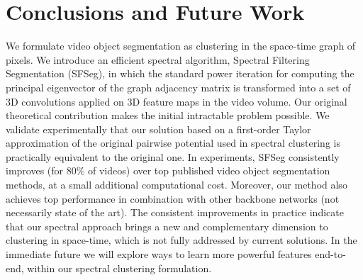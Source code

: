 \documentclass{article}
\begin{document}
\section{Conclusions and Future Work}
\label{sec: conclusions}
We formulate video object segmentation as clustering in the space-time graph of pixels.
We introduce an efficient spectral algorithm, Spectral Filtering Segmentation (SFSeg), in which the standard power iteration for computing the principal eigenvector of the graph adjacency matrix is transformed into a set of 3D convolutions applied on 3D feature maps in the video volume. Our original theoretical contribution makes the initial intractable problem possible. We validate experimentally that our solution based on a first-order Taylor approximation of the original pairwise potential used in spectral clustering is practically equivalent to the original one. In experiments, SFSeg consistently improves (for 80\% of videos) over top published video object segmentation methods, at a small additional computational cost. Moreover, our method also achieves top performance in combination with other backbone networks (not necessarily state of the art). The consistent improvements in practice indicate that our spectral approach brings a new and complementary dimension to clustering in space-time, which is not fully addressed by current solutions. In the immediate future we will explore ways to learn more powerful features end-to-end, within our spectral clustering formulation.

\clearpage 


\end{document}
